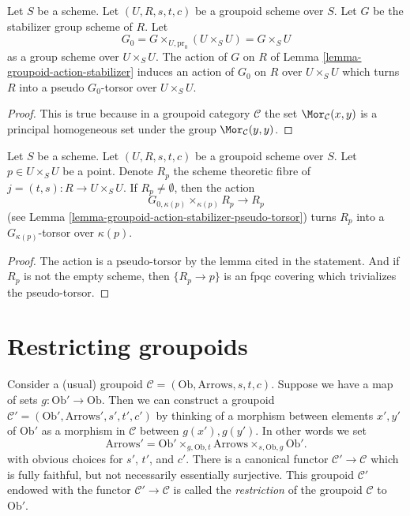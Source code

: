 \begin{lemma}
\label{lemma-groupoid-action-stabilizer-pseudo-torsor}
Let $S$ be a scheme. Let $(U, R, s, t, c)$ be a groupoid scheme
over $S$. Let $G$ be the stabilizer group scheme of $R$.
Let
$$
G_0 = G \times_{U, \text{pr}_0} (U \times_S U) = G \times_S U
$$
as a group scheme over $U \times_S U$. The action of $G$ on $R$ of
Lemma \ref{lemma-groupoid-action-stabilizer}
induces an action of $G_0$ on $R$ over $U \times_S U$
which turns $R$ into a pseudo $G_0$-torsor over $U \times_S U$.
\end{lemma}

\begin{proof}
This is true because in a groupoid category $\mathcal{C}$ the set
$\Mor_\mathcal{C}(x, y)$ is a principal homogeneous set
under the group $\Mor_\mathcal{C}(y, y)$.
\end{proof}

\begin{lemma}
\label{lemma-fibres-j}
Let $S$ be a scheme. Let $(U, R, s, t, c)$ be a groupoid scheme over $S$.
Let $p \in U \times_S U$ be a point. Denote
$R_p$ the scheme theoretic fibre of $j = (t, s) : R \to U \times_S U$.
If $R_p \not = \emptyset$, then the action
$$
G_{0, \kappa(p)} \times_{\kappa(p)} R_p \longrightarrow R_p
$$
(see
Lemma \ref{lemma-groupoid-action-stabilizer-pseudo-torsor})
turns $R_p$ into a $G_{\kappa(p)}$-torsor over $\kappa(p)$.
\end{lemma}

\begin{proof}
The action is a pseudo-torsor by the lemma cited in the statement.
And if $R_p$ is not the empty scheme, then $\{R_p \to p\}$
is an fpqc covering which trivializes the pseudo-torsor.
\end{proof}







\section{Restricting groupoids}
\label{section-restrict-groupoid}

\noindent
Consider a (usual) groupoid
$\mathcal{C} = (\text{Ob}, \text{Arrows}, s, t, c)$.
Suppose we have a map of sets $g : \text{Ob}' \to \text{Ob}$.
Then we can construct a groupoid
$\mathcal{C}' = (\text{Ob}', \text{Arrows}', s', t', c')$
by thinking of a morphism between elements $x', y'$ of $\text{Ob}'$
as a morphism in $\mathcal{C}$ between $g(x'), g(y')$.
In other words we set
$$
\text{Arrows}' =
\text{Ob}'
\times_{g, \text{Ob}, t}
\text{Arrows}
\times_{s, \text{Ob}, g}
\text{Ob}'.
$$
with obvious choices for $s'$, $t'$, and $c'$. There is a canonical
functor $\mathcal{C}' \to \mathcal{C}$ which is fully faithful,
but not necessarily essentially surjective. This groupoid $\mathcal{C}'$
endowed with the functor $\mathcal{C}' \to \mathcal{C}$
is called the {\it restriction} of the groupoid
$\mathcal{C}$ to $\text{Ob}'$.

